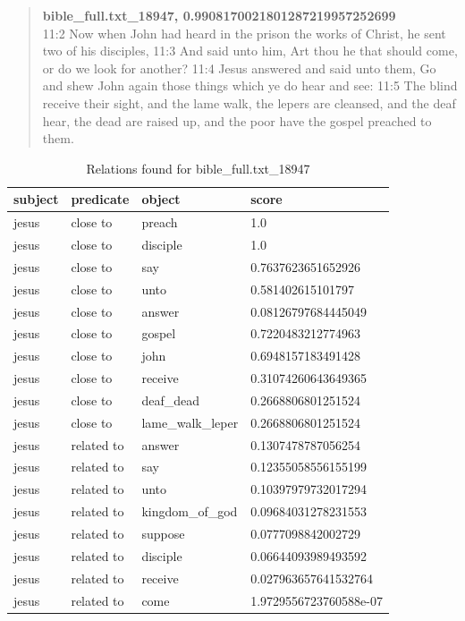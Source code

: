 \clearpage
\blockquote{
\textbf{bible\_full.txt\_18947, 0.9908170021801287219957252699}\\
11:2 Now when John had heard in the prison the works of Christ, he sent two of his disciples, 11:3 And said unto him, Art thou he that should come, or do we look for another? 11:4 Jesus answered and said unto them, Go and shew John again those things which ye do hear and see: 11:5 The blind receive their sight, and the lame walk, the lepers are cleansed, and the deaf hear, the dead are raised up, and the poor have the gospel preached to them.}
\begin{table}[H]
\centering
    \begin{tabular}{|l|l|l|l|}
    \hline
    subject & predicate & object & score \\
    \hline
    jesus & close to & preach & 1.0\\
    jesus &close to& disciple & 1.0\\
    jesus &close to& say  &0.7637623651652926\\
    jesus &close to& unto & 0.581402615101797\\
    jesus &close to& answer & 0.08126797684445049\\
    jesus &close to& gospel & 0.7220483212774963\\
    jesus &close to& john &0.6948157183491428\\
    jesus &close to& receive & 0.31074260643649365\\
    jesus &close to& deaf\_dead & 0.2668806801251524\\
    jesus &close to& lame\_walk\_leper & 0.2668806801251524\\
    \hline
    jesus & related to & answer & 0.1307478787056254 \\
    jesus &related to & say & 0.12355058556155199 \\
    jesus & related to & unto & 	0.10397979732017294 \\
    jesus &related to & kingdom\_of\_god & 	0.09684031278231553 \\
    jesus & related to & suppose & 0.0777098842002729 \\
    jesus &related to & disciple & 0.06644093989493592\\
    jesus & related to & receive & 0.027963657641532764 \\
    jesus &related to & come & 1.9729556723760588e-07 \\
    \hline
\end{tabular}
\caption{Relations found for bible\_full.txt\_18947}
\label{tab:relations_jesus,devil_18497}
\end{table}

